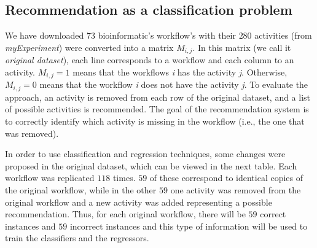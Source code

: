\documentclass[a0, portrait]{a0poster}
\begin{document}
\begin{multicols}{2}
\subsection*{Recommendation as a classification problem}
We have downloaded $73$ bioinformatic's workflow's with their $280$ activities (from \emph{myExperiment}) were converted into a matrix $M_{i, j}$. In this matrix (we call it \emph{original dataset}), each line corresponds to a workflow and each column to an activity. $M_{i, j} = 1$ means that the workflows \emph{i} has the activity \emph{j}. Otherwise, $M_{i, j} = 0$ means that the workflow \emph{i} does not have the activity \emph{j}. To evaluate the approach, an activity is removed from each row of the original dataset, and a list of possible activities is recommended. The goal of the recommendation system is to correctly identify which activity is missing in the workflow (i.e., the one that was removed).

In order to use classification and regression techniques, some changes were proposed in the original dataset, which can be viewed in the next table. Each workflow was replicated \(118\) times. \(59\) of these correspond to identical copies of the original workflow, while in the other \(59\) one activity was removed from the original workflow and a new activity was added representing a possible recommendation. Thus, for each original workflow, there will be \(59\) correct instances and \(59\) incorrect instances and this type of information will be used to train the classifiers and the regressors.


\end{multicols}
\end{document}
